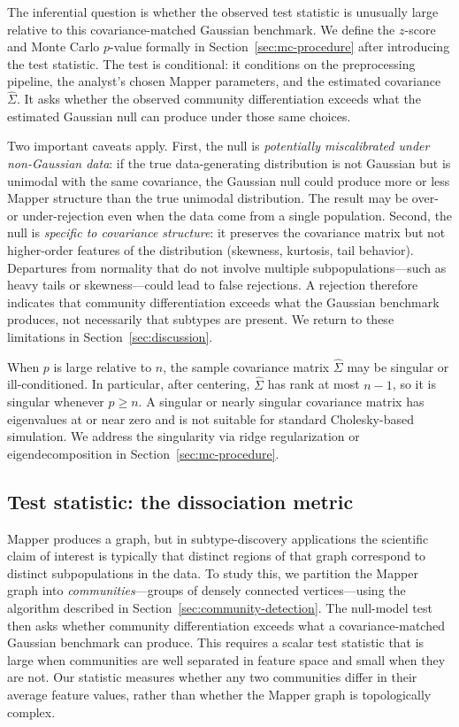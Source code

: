 \documentclass[hidelinks]{siamart251216}
\begin{document}
The inferential question is whether the observed test statistic is
unusually large relative to this covariance-matched Gaussian benchmark.
We define the $z$-score and Monte Carlo $p$-value formally in
Section~\ref{sec:mc-procedure} after introducing the test statistic.
The test is conditional: it conditions on the preprocessing pipeline,
the analyst's chosen Mapper parameters, and the estimated covariance
$\hat{\Sigma}$.  It asks whether the observed community differentiation
exceeds what the estimated Gaussian null can produce under those same
choices.

Two important caveats apply.  First, the null is \emph{potentially
miscalibrated under non-Gaussian data}: if the true data-generating
distribution is not Gaussian but is unimodal with the same covariance,
the Gaussian null could produce more or less Mapper structure than the
true unimodal distribution.  The result may be over- or under-rejection
even when the data come from a single population.  Second, the null is
\emph{specific to covariance structure}: it preserves the covariance
matrix but not higher-order features of the distribution (skewness,
kurtosis, tail behavior).  Departures from normality that do not involve multiple
subpopulations---such as heavy tails or skewness---could lead to false
rejections.  A rejection therefore indicates that community
differentiation exceeds what the Gaussian benchmark produces, not
necessarily that subtypes are present.  We return to these limitations
in Section~\ref{sec:discussion}.

When $p$ is large relative to $n$, the sample covariance matrix
$\hat{\Sigma}$ may be singular or ill-conditioned.  In particular,
after centering, $\hat{\Sigma}$ has rank at most $n-1$, so it is
singular whenever $p \ge n$.  A singular or nearly singular covariance
matrix has eigenvalues at or near zero and is not suitable for standard
Cholesky-based simulation.  We address the singularity via ridge regularization or
eigendecomposition in Section~\ref{sec:mc-procedure}.


\subsection{Test statistic: the dissociation metric}\label{sec:test-stat}

Mapper produces a graph, but in subtype-discovery applications the
scientific claim of interest is typically that distinct regions of that
graph correspond to distinct subpopulations in the data.  To study
this, we partition the Mapper graph into
\emph{communities}---groups of densely connected vertices---using the
algorithm described in Section~\ref{sec:community-detection}.  The
null-model test then asks whether community differentiation exceeds
what a covariance-matched Gaussian benchmark can produce.  This
requires a scalar test statistic that is large when communities are
well separated in feature space and small when they are not.  Our
statistic measures whether any two communities differ in their average
feature values, rather than whether the Mapper graph is topologically
complex.
\end{document}
